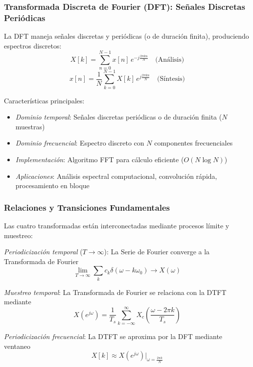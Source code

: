 \documentclass[
  11pt,
  letterpaper,
   addpoints,
   answers
  ]{exam}
\begin{document}
\subsubsection*{Transformada Discreta de Fourier (DFT): Señales Discretas Periódicas}
La DFT maneja señales discretas y periódicas (o de duración finita), produciendo espectros discretos:
\begin{equation}
X[k] = \sum_{n=0}^{N-1} x[n]\,e^{-j\frac{2\pi kn}{N}} \quad \text{(Análisis)}
\end{equation}
\begin{equation}
x[n] = \frac{1}{N}\sum_{k=0}^{N-1} X[k]\,e^{j\frac{2\pi kn}{N}} \quad \text{(Síntesis)}
\end{equation}

Características principales:
\begin{itemize}
\item \textit{Dominio temporal}: Señales discretas periódicas o de duración finita (\(N\) muestras)
\item \textit{Dominio frecuencial}: Espectro discreto con \(N\) componentes frecuenciales
\item \textit{Implementación}: Algoritmo FFT para cálculo eficiente (\(O(N \log N)\))
\item \textit{Aplicaciones}: Análisis espectral computacional, convolución rápida, procesamiento en bloque
\end{itemize}

\subsubsection*{Relaciones y Transiciones Fundamentales}
Las cuatro transformadas están interconectadas mediante procesos límite y muestreo:

\textit{Periodicización temporal} (\(T \to \infty\)): La Serie de Fourier converge a la Transformada de Fourier
\begin{equation}
\lim_{T \to \infty} \sum_{k} c_k \delta(\omega - k\omega_0) \to X(\omega)
\end{equation}

\textit{Muestreo temporal}: La Transformada de Fourier se relaciona con la DTFT mediante
\begin{equation}
X(e^{j\omega}) = \frac{1}{T_s}\sum_{k=-\infty}^{\infty} X_c\left(\frac{\omega - 2\pi k}{T_s}\right)
\end{equation}

\textit{Periodicización frecuencial}: La DTFT se aproxima por la DFT mediante ventaneo
\begin{equation}
X[k] \approx X(e^{j\omega})\big|_{\omega = \frac{2\pi k}{N}}
\end{equation}
\end{document}
